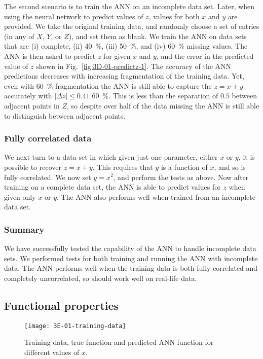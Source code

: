 \documentclass[review]{elsarticle}
\newcommand{\figref}[1]{Fig.~\ref{#1}}
\begin{document}
The second scenario is to train the ANN on an incomplete data set. Later,
when using the neural network to predict values of $z$, values for both $x$
and $y$ are provided.  We take the original training data, and randomly
choose a set of entries (in any of $X$, $Y$, or $Z$), and set them as
blank. We train the ANN on data sets that are (i) complete, (ii)
\SI{40}{\percent}, (iii) \SI{50}{\percent}, and (iv) \SI{60}{\percent}
missing values. The ANN is then asked to predict $z$ for given $x$ and $y$,
and the error in the predicted value of $z$ shown in
\figref{fig:3D-01-predictz-1}. The accuracy of the ANN predictions decreases
with increasing fragmentation of the training data. Yet, even with
\SI{60}{\percent} fragmentation the ANN is still able to capture the $z=x+y$
accurately with $\left|\Delta z\right|\leq0.41$ \SI{60}{\percent}. This is
less than the separation of $0.5$ between adjacent points in $Z$, so despite
over half of the data missing the ANN is still able to distinguish between
adjacent points.

\subsubsection{Fully correlated data}

We next turn to a data set in which given just one parameter, either $x$ or
$y$, it is possible to recover $z=x+y$. This requires that $y$ is a function
of $x$, and so is fully correlated. We now set $y=x^2$, and perform the
tests as above. Now after training on a complete data set, the ANN is able
to predict values for $z$ when given only $x$ or $y$. The ANN also performs
well when trained from an incomplete data set.

\subsubsection{Summary}

We have successfully tested the capability of the ANN to handle incomplete
data sets. We performed tests for both training and running the ANN with
incomplete data. The ANN performs well when the training data is both fully
correlated and completely uncorrelated, so should work well on real-life
data.

\subsection{Functional properties}\label{sec:FunctionalData}

\begin{figure}
 \centering
 \texttt{[image: 3E-01-training-data]}
 \caption{Training data, true function and predicted ANN function for
   different values of $x$.}
 \label{fig:3E-01-training-data}
\end{figure}
\end{document}
